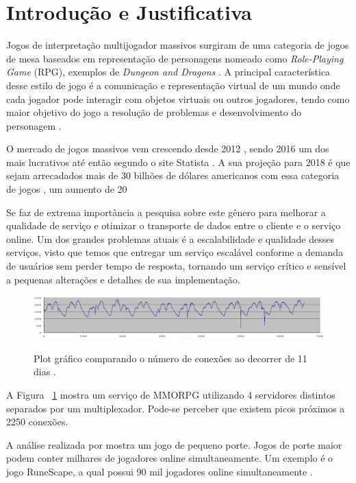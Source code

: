 \section{Introdução e Justificativa}
\label{sec:int}

Jogos de interpretação multijogador massivos surgiram de uma categoria de jogos de mesa baseados em representação de personagens nomeado como \textit{Role-Playing Game} (RPG), exemplos de \textit{Dungeon and Dragons} \cite{tsr1980dungeons}. A principal característica desse estilo de jogo é a comunicação e representação virtual de um mundo onde cada jogador pode interagir com objetos virtuais ou outros jogadores, tendo como maior objetivo do jogo a resolução de problemas e desenvolvimento do personagem \cite{video_game_technologies}.

O mercado de jogos massivos vem crescendo desde 2012 \cite{new_york_times}, sendo 2016 um dos mais lucrativos até então segundo o site Statista \cite{statista_2016}. A sua projeção para 2018 é que sejam arrecadados mais de 30 bilhões de dólares americanos com essa categoria de jogos \cite{statista_2018}, um aumento de 20%

Se faz de extrema importância a pesquisa sobre este gênero para melhorar a qualidade de serviço e otimizar o transporte de dados entre o cliente e o serviço online. Um dos grandes problemas atuais é a escalabilidade e qualidade desses serviços, visto que temos que entregar um serviço escalável conforme a demanda de usuários sem perder tempo de resposta, tornando um serviço crítico e sensível a pequenas alterações e detalhes de sua implementação.

\begin{figure}[h]
\caption{Plot gráfico comparando o número de conexões ao decorrer de 11 dias
\cite{system_performance}.}
\centering
\includegraphics[width=1\textwidth]{img/connection_peer_hour.png}
\label{fig:conection_peer_hour}
\end{figure}

A Figura ~\ref{fig:conection_peer_hour} mostra um serviço de MMORPG utilizando 4 servidores distintos separados por um multiplexador. Pode-se perceber que existem picos próximos a 2250 conexões.

A análise realizada por \cite{system_performance} mostra um jogo de pequeno porte. Jogos de porte maior podem conter milhares de jogadores online simultaneamente. Um exemplo é o jogo RuneScape, a qual possui 90 mil jogadores online simultaneamente \cite{runescape_online_users}.

